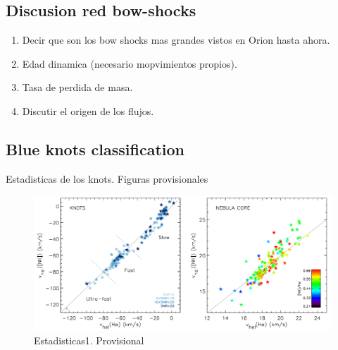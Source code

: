 \documentclass[a4paper,fleqn,usenatbib]{mnras}     %
\begin{document}
\subsection{Discusion red bow-shocks}\label{sec:disc_bowshocks}
\renewcommand{\labelenumi}{$\bullet$}
\begin{enumerate}
 \item Decir que son los bow shocks mas grandes vistos en Orion hasta ahora.
 \item Edad dinamica (necesario mopvimientos propios).
 \item Tasa de perdida de masa.
 \item Discutir el origen de los flujos.
\end{enumerate}









\subsection{Blue knots classification}\label{sec:blueknots_classification}
Estadisticas de los knots. Figuras provisionales


\begin{figure}
    \includegraphics[width=\textwidth]{Figs/prov/Vnii_Vha.pdf} 
    \caption{Estadisticas1. Provisional}
    \label{fig:blue_stad}
\end{figure}
\end{document}
